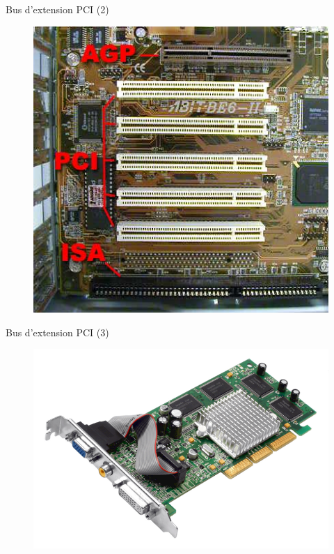 \documentclass[12pt, t]{beamer}
\begin{document}
\begin{frame}{Bus d'extension PCI (2)}

    \begin{figure}
        \centering
        \includegraphics[scale=0.4]{agp-or-pci-or-isa.jpg}
    \end{figure}

\end{frame}

\begin{frame}{Bus d'extension PCI (3)}

    \begin{figure}
        \centering
        \includegraphics[scale=0.35]{graphic-card.png}
    \end{figure}

\end{frame}
\end{document}
